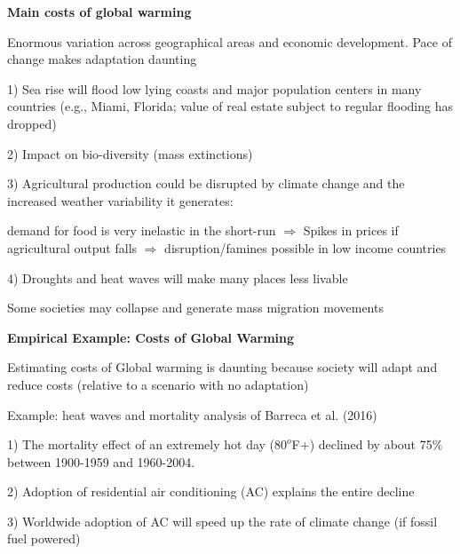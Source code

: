 \documentclass[landscape]{slides}
\begin{document}
\begin{slide}

\end{slide}



\begin{slide}
\begin{center}
{\bf Main costs of global warming}
\end{center}
Enormous variation across geographical areas and economic development. Pace of change
makes adaptation daunting

1) Sea rise will flood low lying coasts and major population centers in many countries (e.g., Miami, Florida; value of
real estate subject to regular flooding has dropped)

2) Impact on bio-diversity (mass extinctions)

3) Agricultural production could be disrupted by climate change and the increased weather variability it generates: 

\small demand for food
is very inelastic in the short-run $\Rightarrow$ Spikes in prices if agricultural output falls $\Rightarrow$ disruption/famines possible in low income countries

\normalsize

4) Droughts and heat waves will make many places less livable 

\small Some societies may collapse and generate mass migration movements

\end{slide}




\begin{slide}
\begin{center}
{\bf Empirical Example: Costs of Global Warming}
\end{center}

Estimating costs of Global warming is daunting because society will adapt and
reduce costs (relative to a scenario with no adaptation)

Example: heat waves and mortality analysis of Barreca et al. (2016)

1) The mortality effect of an extremely hot day ($80^o$F+) declined by about 75\% between 1900-1959 and 1960-2004.

2) Adoption of residential air conditioning (AC) explains the entire decline

3) Worldwide adoption of AC will speed up the rate of climate change (if fossil fuel powered)

\end{slide}
\end{document}
